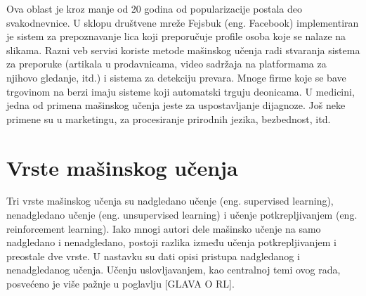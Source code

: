 Ova oblast je kroz manje od 20 godina od popularizacije postala deo svakodnevnice. U sklopu društvene mreže Fejsbuk (eng. Facebook) implementiran je sistem za prepoznavanje lica koji preporučuje profile osoba koje se nalaze na slikama. Razni veb servisi koriste metode mašinskog učenja radi stvaranja sistema za preporuke (artikala u prodavnicama, video sadržaja na platformama za njihovo gledanje, itd.) i sistema za detekciju prevara. Mnoge firme koje se bave trgovinom na berzi imaju sisteme koji automatski trguju deonicama. U medicini, jedna od primena mašinskog učenja jeste za uspostavljanje dijagnoze. Još neke primene su u marketingu, za procesiranje prirodnih jezika, bezbednost, itd.



\section{Vrste mašinskog učenja}

Tri vrste mašinskog učenja su nadgledano učenje (eng. supervised learning), nenadgledano učenje (eng. unsupervised learning) i učenje potkrepljivanjem (eng. reinforcement learning). Iako mnogi autori dele mašinsko učenje na samo nadgledano i nenadgledano, postoji razlika između učenja potkrepljivanjem i preostale dve vrste. U nastavku su dati opisi pristupa nadgledanog i nenadgledanog učenja. Učenju uslovljavanjem, kao centralnoj temi ovog rada, posvećeno je više pažnje u poglavlju [GLAVA O RL]. 